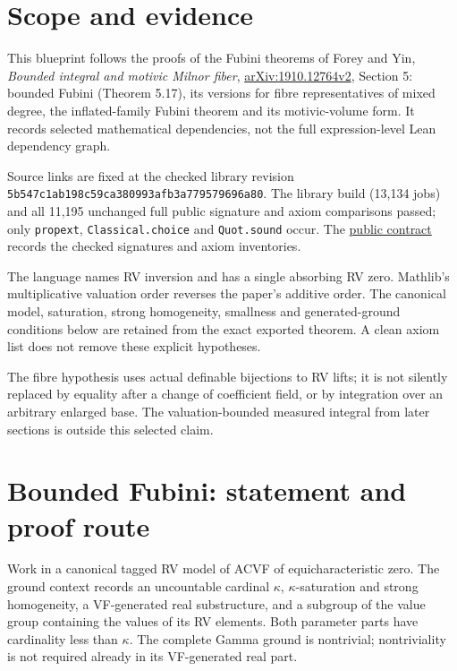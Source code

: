 \section{Scope and evidence}
This blueprint follows the proofs of the Fubini theorems of Forey and Yin,
\emph{Bounded integral and motivic Milnor fiber},
\href{https://arxiv.org/abs/1910.12764v2}{arXiv:1910.12764v2}, Section 5:
bounded Fubini (Theorem 5.17), its versions for fibre representatives of
mixed degree, the inflated-family Fubini theorem and its motivic-volume form.
It records selected mathematical dependencies, not the full expression-level
Lean dependency graph.

Source links are fixed at the checked library revision
\texttt{5b547c1ab198c59ca380993afb3a779579696a80}.
The library build (13,134 jobs) and all 11,195 unchanged full public
signature and axiom comparisons passed; only \texttt{propext},
\texttt{Classical.choice} and \texttt{Quot.sound} occur. The
\href{https://github.com/daviddhilbert/Fubini-theorems/blob/5b547c1ab198c59ca380993afb3a779579696a80/verification/public-contract.json}{public contract}
records the checked signatures and axiom inventories.

The language names RV inversion and has a single absorbing RV zero.
Mathlib's multiplicative valuation order reverses the paper's additive order.
The canonical model, saturation, strong homogeneity, smallness and generated-ground
conditions below are retained from the exact exported theorem. A clean axiom
list does not remove these explicit hypotheses.

The fibre hypothesis uses actual definable bijections to RV lifts; it is not
silently replaced by equality after a change of coefficient field, or by
integration over an arbitrary enlarged base. The valuation-bounded measured
integral from later sections is outside this selected claim.

\section{Bounded Fubini: statement and proof route}

\begin{definition}
\label{ground}
\leanok
Work in a canonical tagged RV model of ACVF of equicharacteristic zero. The ground context records an uncountable cardinal $\kappa$, $\kappa$-saturation and strong homogeneity, a VF-generated real substructure, and a subgroup of the value group containing the values of its RV elements. Both parameter parts have cardinality less than $\kappa$. The complete Gamma ground is nontrivial; nontriviality is not required already in its VF-generated real part.
\end{definition}

